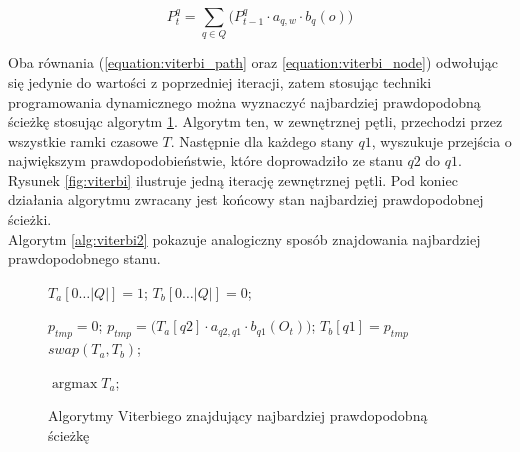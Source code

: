 \documentclass[11pt]{article}
\DeclareMathOperator*{\argmax}{\arg\max}   %
\begin{document}
		   \begin{equation}
		   P_t^q=\sum_{q \in Q} \bigg( P_{t-1}^q\cdot a_{q,w}\cdot b_q(o) \bigg)
		   \label{equation:viterbi_node}
		   \end{equation}
		   
		  Oba równania (\ref{equation:viterbi_path} oraz \ref{equation:viterbi_node}) odwołując się jedynie do wartości z poprzedniej iteracji, zatem stosując techniki programowania dynamicznego można wyznaczyć najbardziej prawdopodobną ścieżkę stosując algorytm \ref{alg:viterbi}. Algorytm ten, w zewnętrznej pętli, przechodzi przez wszystkie ramki czasowe $T$. Następnie dla każdego stany $q1$, wyszukuje przejścia o największym prawdopodobieństwie, które doprowadziło ze stanu $q2$ do $q1$. Rysunek \ref{fig:viterbi} ilustruje jedną iterację zewnętrznej pętli. Pod koniec działania algorytmu zwracany jest końcowy stan najbardziej prawdopodobnej ścieżki. \\
		  Algorytm \ref{alg:viterbi2} pokazuje analogiczny sposób znajdowania najbardziej prawdopodobnego stanu.
		
		  \begin{figure}
			   \begin{algorithmic}[1]
				   	
					   	
					   	\STATE $T_a[0 \ldots |Q|] = 1$;
					   	\STATE $T_b[0 \ldots |Q|] = 0$;
					   	
							   	\STATE $p_{tmp} = 0$;
									   	\STATE $p_{tmp} = \bigg( T_a[q2]\cdot a_{q2,q1}\cdot b_{q1}(O_t) \bigg)$;
								   	\ENDIF
							   	\ENDFOR
							   	\STATE $T_b[q1] = p_{tmp}$
						   	\ENDFOR
						   	\STATE $swap(T_a, T_b)$;
					   	\ENDFOR
					   	
					   	\RETURN $\argmax{T_a}$;
			   \end{algorithmic}
		  \caption{Algorytmy Viterbiego znajdujący najbardziej prawdopodobną ścieżkę}
		  \label{alg:viterbi}
		  \end{figure}		
	  
\end{document}
